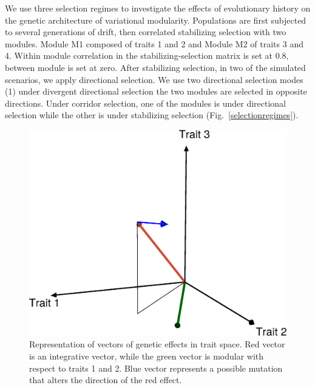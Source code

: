 \begin{refsection}
We use three selection regimes to investigate the effects of evolutionary
history on the genetic architecture of variational modularity. Populations are
first subjected to several generations of drift, then correlated stabilizing
selection with two modules. Module M1 composed of traits 1 and 2 and Module M2
of traits 3 and 4. Within module correlation in the stabilizing-selection matrix
is set at 0.8, between module is set at zero. After stabilizing selection, in
two of the simulated scenarios, we apply directional selection. We use two
directional selection modes (1) under divergent directional selection the two
modules are selected in opposite directions. Under corridor selection, one of
the modules is under directional selection while the other is under stabilizing
selection (Fig.~\ref{selectionregimes}).

\begin{figure}
    \centering
    \includegraphics[width=\linewidth]{chapter_atchley/media/plot.eps}
    \caption[Pleiotropic effect in trait space]{Representation of vectors of genetic effects in trait space. Red vector is an integrative vector, while the green vector is modular with respect to traits 1 and 2. Blue vector represents a possible mutation that alters the direction of the red effect.}
    \label{effectvectors}
\end{figure}


\end{refsection}

